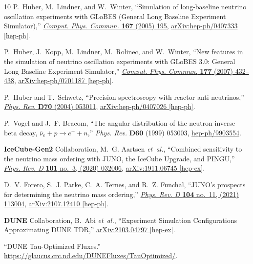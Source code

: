 \documentclass[aps, prd, onecolumn, tightenlines, notitlepage, superscriptaddress, nofootinbib, preprintnumbers, floatfix,showkeys,11pt]{revtex4-2}
\begin{document}
\begin{thebibliography}{10}
P.~Huber, M.~Lindner, and W.~Winter, ``{Simulation of long-baseline neutrino
  oscillation experiments with GLoBES (General Long Baseline Experiment
  Simulator)},'' \href{http://dx.doi.org/10.1016/j.cpc.2005.01.003}{{\em
  Comput. Phys. Commun.} {\bfseries 167} (2005) 195},
\href{http://arxiv.org/abs/hep-ph/0407333}{{\ttfamily arXiv:hep-ph/0407333
  [hep-ph]}}.

P.~Huber, J.~Kopp, M.~Lindner, M.~Rolinec, and W.~Winter, ``{New features in
  the simulation of neutrino oscillation experiments with GLoBES 3.0: General
  Long Baseline Experiment Simulator},''
  \href{http://dx.doi.org/10.1016/j.cpc.2007.05.004}{{\em Comput. Phys.
  Commun.} {\bfseries 177} (2007) 432--438},
\href{http://arxiv.org/abs/hep-ph/0701187}{{\ttfamily arXiv:hep-ph/0701187
  [hep-ph]}}.

P.~Huber and T.~Schwetz, ``{Precision spectroscopy with reactor
  anti-neutrinos},'' \href{http://dx.doi.org/10.1103/PhysRevD.70.053011}{{\em
  Phys. Rev.} {\bfseries D70} (2004) 053011},
\href{http://arxiv.org/abs/hep-ph/0407026}{{\ttfamily arXiv:hep-ph/0407026
  [hep-ph]}}.

P.~Vogel and J.~F. Beacom, ``The angular distribution of the neutron inverse
  beta decay, $\overline{\nu}_e + p \to e^+ + n$,'' {\em Phys. Rev.} {\bfseries
  D60} (1999) 053003,
\href{http://arxiv.org/abs/hep-ph/9903554}{{\ttfamily hep-ph/9903554}}.

{\bfseries IceCube-Gen2} Collaboration, M.~G. Aartsen {\em et~al.}, ``{Combined
  sensitivity to the neutrino mass ordering with JUNO, the IceCube Upgrade, and
  PINGU},'' \href{http://dx.doi.org/10.1103/PhysRevD.101.032006}{{\em Phys.
  Rev. D} {\bfseries 101} no.~3, (2020) 032006},
  \href{http://arxiv.org/abs/1911.06745}{{\ttfamily arXiv:1911.06745
  [hep-ex]}}.

D.~V. Forero, S.~J. Parke, C.~A. Ternes, and R.~Z. Funchal,
  ``{JUNO\textquoteright{}s prospects for determining the neutrino mass
  ordering},'' \href{http://dx.doi.org/10.1103/PhysRevD.104.113004}{{\em Phys.
  Rev. D} {\bfseries 104} no.~11, (2021) 113004},
  \href{http://arxiv.org/abs/2107.12410}{{\ttfamily arXiv:2107.12410
  [hep-ph]}}.

{\bfseries DUNE} Collaboration, B.~Abi {\em et~al.}, ``{Experiment Simulation
  Configurations Approximating DUNE TDR},''
  \href{http://arxiv.org/abs/2103.04797}{{\ttfamily arXiv:2103.04797
  [hep-ex]}}.

``{DUNE Tau-Optimized Fluxes}.''
\newblock \url{https://glaucus.crc.nd.edu/DUNEFluxes/TauOptimized/}.

\end{thebibliography}\endgroup
\end{document}
